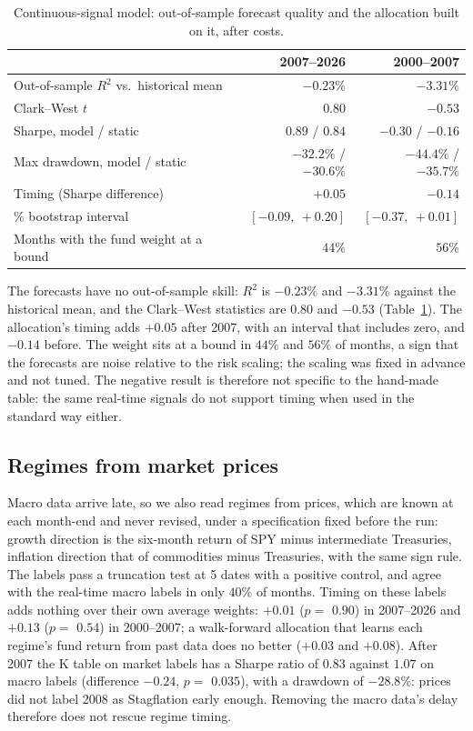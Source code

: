 \documentclass[11pt,a4paper]{article}
\begin{document}
\begin{table}[htbp]
\centering
\caption{Continuous-signal model: out-of-sample forecast quality and the allocation built on it, after costs.}
\label{tab:model}
\small
\begin{tabular}{@{}lrr@{}}
\toprule
& 2007--2026 & 2000--2007 \\
\midrule
Out-of-sample $R^2$ vs.\ historical mean & $-0.23\%$ & $-3.31\%$ \\
Clark--West $t$ & $0.80$ & $-0.53$ \\
Sharpe, model / static & $0.89$ / $0.84$ & $-0.30$ / $-0.16$ \\
Max drawdown, model / static & $-32.2\%$ / $-30.6\%$ & $-44.4\%$ / $-35.7\%$ \\
Timing (Sharpe difference) & $+0.05$ & $-0.14$ \\
\quad 90\% bootstrap interval & $[-0.09,\ +0.20]$ & $[-0.37,\ +0.01]$ \\
Months with the fund weight at a bound & $44\%$ & $56\%$ \\
\bottomrule
\end{tabular}
\end{table}

The forecasts have no out-of-sample skill: $R^2$ is $-0.23\%$ and $-3.31\%$ against the historical mean, and the
Clark--West statistics are $0.80$ and $-0.53$ (Table~\ref{tab:model}). The allocation's timing adds $+0.05$
after 2007, with an interval that includes zero, and $-0.14$ before. The weight sits at a bound in $44\%$ and
$56\%$ of months, a sign that the forecasts are noise relative to the risk scaling; the scaling was fixed in
advance and not tuned. The negative result is therefore not specific to the hand-made table: the same real-time
signals do not support timing when used in the standard way either.

\subsection{Regimes from market prices}
\label{sec:market}

Macro data arrive late, so we also read regimes from prices, which are known at each month-end and never
revised, under a specification fixed before the run: growth direction is the six-month return of SPY minus
intermediate Treasuries, inflation direction that of commodities minus Treasuries, with the same sign rule.
The labels pass a truncation test at 5 dates with a positive control, and agree with the real-time macro
labels in only $40\%$ of months. Timing on these labels adds nothing over their own average weights:
$+0.01$ ($p=$ $0.90$) in 2007--2026 and $+0.13$ ($p=$ $0.54$) in 2000--2007; a walk-forward
allocation that learns each regime's fund return from past data does no better ($+0.03$ and $+0.08$).
After 2007 the K table on market labels has a Sharpe ratio of $0.83$ against $1.07$ on macro labels
(difference $-0.24$, $p=$ $0.035$), with a drawdown of $-28.8\%$: prices did not label 2008 as
Stagflation early enough. Removing the macro data's delay therefore does not rescue regime timing.
\end{document}
